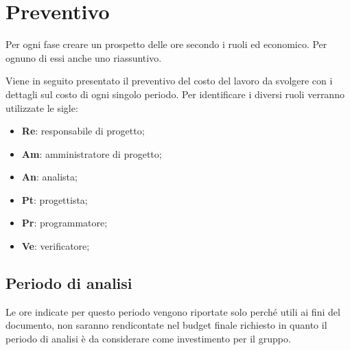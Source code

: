 \section{Preventivo} %
Per ogni fase creare un prospetto delle ore secondo i ruoli ed economico. Per ognuno di essi anche uno riassuntivo.

Viene in seguito presentato il preventivo del costo del lavoro da svolgere con i dettagli sul costo di ogni singolo periodo.
Per identificare i diversi ruoli verranno utilizzate le sigle:
\begin{itemize}
	\item \textbf{Re}: responsabile di progetto\glo;
	\item \textbf{Am}: amministratore di progetto\glo;
	\item \textbf{An}: analista;
	\item \textbf{Pt}: progettista;
	\item \textbf{Pr}: programmatore;
	\item \textbf{Ve}: verificatore;
\end{itemize}
	\subsection{Periodo di analisi}
	Le ore indicate per questo periodo vengono riportate solo perché utili ai fini del documento, non saranno rendicontate nel budget finale richiesto in quanto il periodo di analisi è da considerare come investimento per il gruppo.
	\pagebreak
